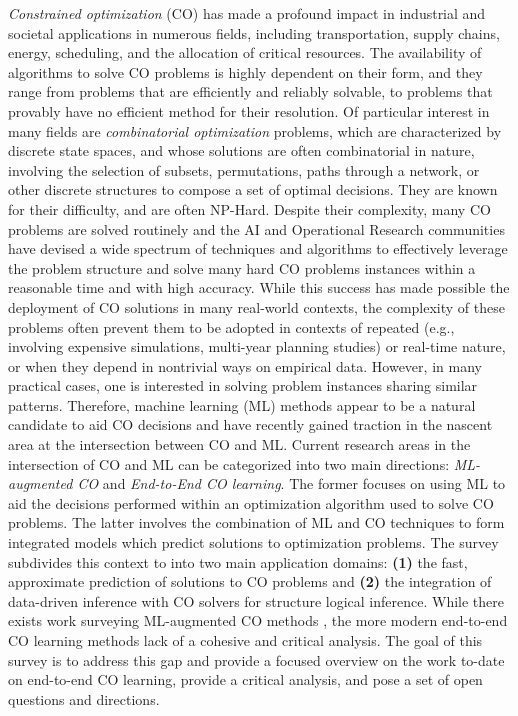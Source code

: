 

\emph{Constrained optimization} (CO) has made a profound impact in industrial and societal applications in numerous fields, including transportation, supply chains, energy, scheduling, and the allocation of critical resources. The availability of algorithms to solve CO problems is highly dependent on their form, and they range from problems that are efficiently and reliably solvable, to problems that provably have no efficient method for their resolution. 
Of particular interest in many fields are \emph{combinatorial optimization} problems, which are characterized by discrete state spaces, and whose solutions are often combinatorial in nature, involving the selection of subsets, permutations, paths through a network, or other discrete structures to compose a set of optimal decisions. They are known for their difficulty, and are often NP-Hard.
Despite their complexity, many CO problems are solved routinely and the AI and Operational Research communities have devised a wide spectrum of techniques and algorithms to effectively leverage the problem structure and solve many hard CO problems instances within a reasonable time and with high accuracy. While this success has made possible the deployment of CO solutions in many real-world contexts, the complexity of these problems often prevent them to be adopted in contexts of repeated (e.g., involving expensive simulations, multi-year planning studies) or real-time nature, or when they depend in nontrivial ways on empirical data. 
However, in many practical cases, one is interested in solving problem instances sharing similar patterns. Therefore, machine learning (ML) methods appear to be a natural candidate to aid CO decisions and have recently gained traction in the nascent area at the intersection between CO and ML.
Current research areas in the intersection of CO and ML can be categorized into two main directions: {\emph{ML-augmented CO}} and {\emph{End-to-End CO learning}}. 
The former focuses on using ML to aid the decisions performed within an optimization algorithm used to solve CO problems. The latter involves the combination of ML and CO techniques to form integrated models which predict solutions to optimization problems. The survey subdivides this context to into two main application domains: {\bf (1)} the fast, approximate prediction of solutions to CO problems and {\bf (2)} the integration of data-driven inference with CO solvers for structure logical inference.
While there exists work surveying ML-augmented CO methods , the more modern end-to-end CO learning methods lack of a cohesive and critical analysis. The goal of this survey is to address this gap and provide a focused overview on the work to-date on end-to-end CO learning, provide a critical analysis, and pose a set of open questions and directions.

